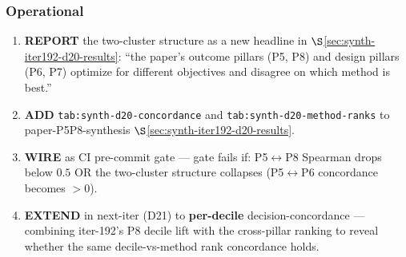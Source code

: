\subsubsection{Operational}\label{sec:synth-iter192-d20-operational}
\begin{enumerate}
\item \textbf{REPORT} the two-cluster structure as a new headline in
  $\S$\ref{sec:synth-iter192-d20-results}: ``the paper's outcome
  pillars (P5, P8) and design pillars (P6, P7) optimize for different
  objectives and disagree on which method is best.''
\item \textbf{ADD} \texttt{tab:synth-d20-concordance} and
  \texttt{tab:synth-d20-method-ranks} to
  paper-P5P8-synthesis $\S$\ref{sec:synth-iter192-d20-results}.
\item \textbf{WIRE} as CI pre-commit gate --- gate fails if:
  P5$\leftrightarrow$P8 Spearman drops below $0.5$ OR the two-cluster
  structure collapses (P5$\leftrightarrow$P6 concordance becomes $> 0$).
\item \textbf{EXTEND} in next-iter (D21) to \textbf{per-decile}
  decision-concordance --- combining iter-192's P8 decile lift with the
  cross-pillar ranking to reveal whether the same decile-vs-method rank
  concordance holds.
\end{enumerate}